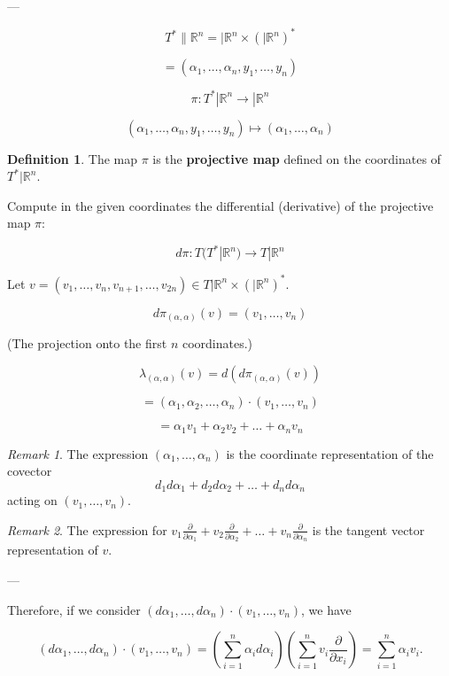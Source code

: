 \documentclass[11pt]{article}
\theoremstyle{definition}
\newtheorem{definition}{Definition}[section]
\theoremstyle{remark}
\newtheorem{remark}{Remark}[section]
\begin{document}
---

\[
T^* \| \mathbb{R}^n = |\mathbb{R}^n \times (|\mathbb{R}^n)^*
\]

\[
= (\alpha_1, \dots, \alpha_n, y_1, \dots, y_n)
\]

\[
\pi : T^* |\mathbb{R}^n \to |\mathbb{R}^n
\]

\[
(\alpha_1, \dots, \alpha_n, y_1, \dots, y_n) \mapsto (\alpha_1, \dots, \alpha_n)
\]

\begin{definition}\label{def:projection_map}
The map \(\pi\) is the \textbf{projective map} defined on the coordinates of \(T^* |\mathbb{R}^n\).
\end{definition}

Compute in the given coordinates the differential (derivative) of the projective map \(\pi\):

\[
d\pi : T(T^* |\mathbb{R}^n) \to T |\mathbb{R}^n
\]

Let \(v = (v_1, \dots, v_n, v_{n+1}, \dots, v_{2n}) \in T |\mathbb{R}^n \times (|\mathbb{R}^n)^*\).

\[
d\pi_{(\alpha, \alpha)}(v) = (v_1, \dots, v_n)
\]

(The projection onto the first \(n\) coordinates.)

\[
\lambda_{(\alpha, \alpha)}(v) = d(d\pi_{(\alpha, \alpha)}(v))
\]

\[
= (\alpha_1, \alpha_2, \dots, \alpha_n) \cdot (v_1, \dots, v_n)
\]

\[
= \alpha_1 v_1 + \alpha_2 v_2 + \dots + \alpha_n v_n
\]

\begin{remark}\label{rem:covector_expression}
The expression \((\alpha_1, \dots, \alpha_n)\) is the coordinate representation of the covector
\[
d_1 d\alpha_1 + d_2 d\alpha_2 + \dots + d_n d\alpha_n
\]
acting on \((v_1, \dots, v_n)\).
\end{remark}

\begin{remark}\label{rem:tangent_vector_expression}
The expression for \(v_1 \frac{\partial}{\partial \alpha_1} + v_2 \frac{\partial}{\partial \alpha_2} + \dots + v_n \frac{\partial}{\partial \alpha_n}\) is the tangent vector representation of \(v\).
\end{remark}

---

Therefore, if we consider $(d\alpha_1, \dots, d\alpha_n) \cdot (v_1, \dots, v_n)$, we have

\[
(d\alpha_1, \dots, d\alpha_n) \cdot (v_1, \dots, v_n) = \left(\sum_{i=1}^n \alpha_i d\alpha_i\right) \left(\sum_{i=1}^n v_i \frac{\partial}{\partial x_i}\right) = \sum_{i=1}^n \alpha_i v_i.
\]
\end{document}
